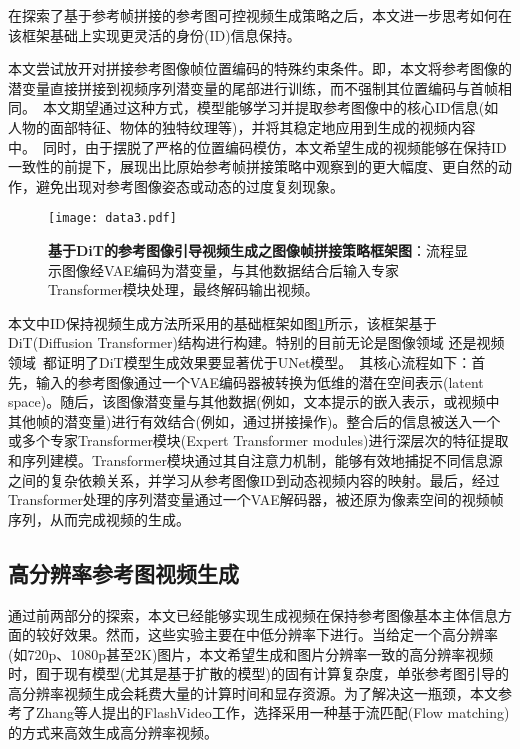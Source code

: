 在探索了基于参考帧拼接的参考图可控视频生成策略之后，本文进一步思考如何在该框架基础上实现更灵活的身份(ID)信息保持。

本文尝试放开对拼接参考图像帧位置编码的特殊约束条件。即，本文将参考图像的潜变量直接拼接到视频序列潜变量的尾部进行训练，而不强制其位置编码与首帧相同。\
本文期望通过这种方式，模型能够学习并提取参考图像中的核心ID信息(如人物的面部特征、物体的独特纹理等)，并将其稳定地应用到生成的视频内容中。\
同时，由于摆脱了严格的位置编码模仿，本文希望生成的视频能够在保持ID一致性的前提下，展现出比原始参考帧拼接策略中观察到的更大幅度、更自然的动作，避免出现对参考图像姿态或动态的过度复刻现象。
\begin{figure}[H]
    \centering
    \texttt{[image: data3.pdf]}
    \caption{\textbf{基于DiT的参考图像引导视频生成之图像帧拼接策略框架图}：流程显示图像经VAE编码为潜变量，与其他数据结合后输入专家Transformer模块处理，最终解码输出视频。}
    \label{architecture1}
\end{figure}
本文中ID保持视频生成方法所采用的基础框架如图\ref{architecture1}所示，该框架基于DiT(Diffusion Transformer)结构进行构建。特别的目前无论是图像领域\cite{peebles2023scalable,chen2023pixart} 还是视频领域~\cite{hong2022cogvideo, yang2024cogvideox, kong2024hunyuanvideo, lin2024open}都证明了DiT模型生成效果要显著优于UNet模型。\
其核心流程如下：首先，输入的参考图像通过一个VAE编码器被转换为低维的潜在空间表示(latent space)。随后，该图像潜变量与其他数据(例如，文本提示的嵌入表示，或视频中其他帧的潜变量)进行有效结合(例如，通过拼接操作)。整合后的信息被送入一个或多个专家Transformer模块(Expert Transformer modules)进行深层次的特征提取和序列建模。Transformer模块通过其自注意力机制，能够有效地捕捉不同信息源之间的复杂依赖关系，并学习从参考图像ID到动态视频内容的映射。最后，经过Transformer处理的序列潜变量通过一个VAE解码器，被还原为像素空间的视频帧序列，从而完成视频的生成。


\subsection{高分辨率参考图视频生成}
通过前两部分的探索，本文已经能够实现生成视频在保持参考图像基本主体信息方面的较好效果。然而，这些实验主要在中低分辨率下进行。当给定一个高分辨率(如720p、1080p甚至2K)图片，本文希望生成和图片分辨率一致的高分辨率视频时，囿于现有模型(尤其是基于扩散的模型)的固有计算复杂度，单张参考图引导的高分辨率视频生成会耗费大量的计算时间和显存资源。为了解决这一瓶颈，本文参考了Zhang等人提出的FlashVideo\cite{zhang2025flashvideo}工作，选择采用一种基于流匹配(Flow matching)的方式来高效生成高分辨率视频。

